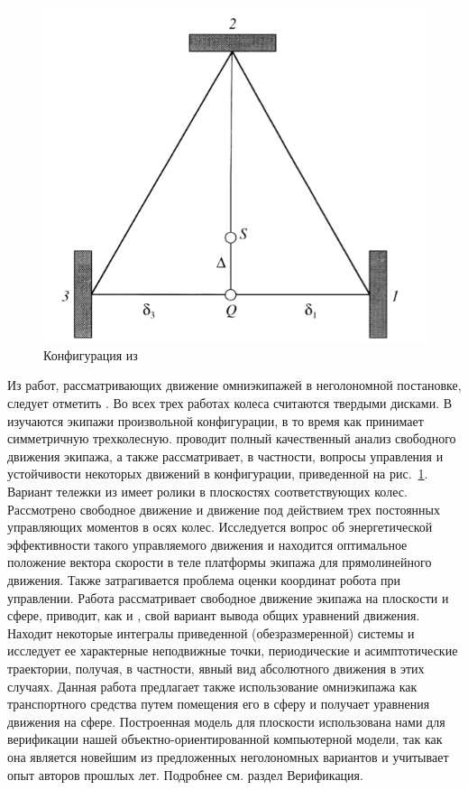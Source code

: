 \documentclass[12pt]{article}
\begin{document}
\begin{figure}
\begin{minipage}{.47\textwidth}
    \centering
    \includegraphics[width=\textwidth]{img/art/zobova.png}
    \caption{Конфигурация из \cite{kos4}}
    \label{fig:zobova}
\end{minipage}
\end{figure}

Из работ, рассматривающих движение омниэкипажей в неголономной постановке, следует отметить \cite{kos4,formalskii,borisov}. Во всех трех работах колеса считаются твердыми дисками. В \cite{kos4,borisov} изучаются экипажи произвольной конфигурации, в то время как \cite{formalskii} принимает симметричную трехколесную. \cite{kos4} проводит полный качественный анализ свободного движения экипажа, а также рассматривает, в частности, вопросы управления и устойчивости некоторых движений в конфигурации, приведенной на рис.~\ref{fig:zobova}. Вариант тележки из \cite{formalskii} имеет ролики в плоскостях соответствующих колес. Рассмотрено свободное движение и движение под действием трех постоянных управляющих моментов в осях колес. Исследуется вопрос об энергетической эффективности такого управляемого движения и находится оптимальное положение вектора скорости в теле платформы экипажа для прямолинейного движения. Также затрагивается проблема оценки координат робота при управлении. Работа\cite{borisov} рассматривает свободное движение экипажа на плоскости и сфере, приводит, как и \cite{kos4}, свой вариант вывода общих уравнений движения. Находит некоторые интегралы приведенной (обезразмеренной) системы и исследует ее характерные неподвижные точки, периодические и асимптотические траектории, получая, в частности, явный вид абсолютного движения в этих случаях. Данная работа предлагает также использование омниэкипажа как транспортного средства путем помещения его в сферу и получает уравнения движения на сфере. Построенная модель для плоскости использована нами для верификации нашей объектно-ориентированной компьютерной модели, так как она является новейшим из предложенных неголономных вариантов и учитывает опыт авторов прошлых лет. Подробнее см. раздел Верификация.\\
\end{document}
